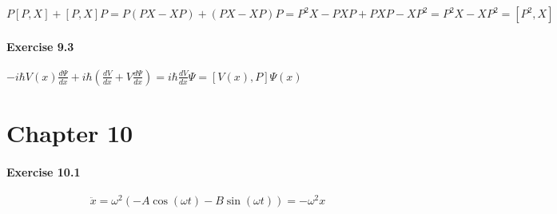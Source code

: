 \documentclass[a4paper]{article}
\begin{document}
\begin{math}
    P [P, X] + [P, X] P = P (P X - X P) + (P X - X P) P = P^{2} X - P X P + P X P - X P^{2} =
    P^{2} X - X P^{2} = [P^{2}, X]
\end{math}

\paragraph{Exercise 9.3}

\begin{math}
    - i \hbar V(x) \frac{d \Psi}{d x} + i \hbar (\frac{d V}{d x} + V \frac{d \Psi}{d x}) =
    i \hbar \frac{d V}{d x} \Psi = [V(x), P] \Psi(x)
\end{math}

\section{Chapter 10}

\paragraph{Exercise 10.1}

$$
    \ddot{x} = \omega^{2} (- A \cos(\omega t) - B \sin(\omega t)) = - \omega^{2} x
$$
\end{document}
